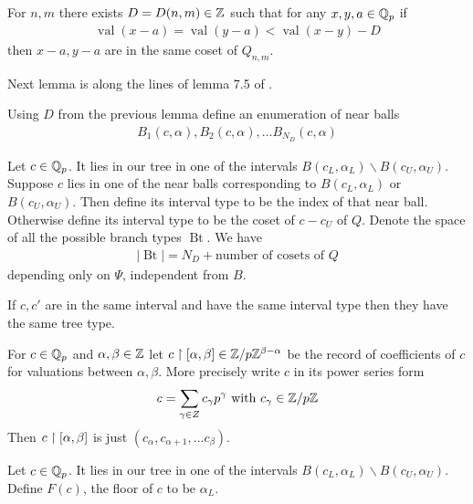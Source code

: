 \documentclass{amsart}
\DeclareMathOperator{\Bt}{Bt}
\DeclareMathOperator{\val}{val}
\begin{document}
\begin{Lemma}
	For $n,m$ there exists $D = D(n,m) \in \mathbb{Z}$ such that for any $x,y,a \in \mathbb{Q}_p$ if
	\begin{align*}
		\val (x - a) = \val (y - a) < \val (x - y) - D
	\end{align*}
	then $x - a, y - a$ are in the same coset of $Q_{n,m}$.
\end{Lemma}

Next lemma is along the lines of lemma 7.5 of \cite{density}.

\begin{Lemma}
	Using $D$ from the previous lemma define an enumeration of near balls
	\begin{align*}
		B_1(c, \alpha), B_2(c, \alpha), \ldots B_{N_D}(c, \alpha)
	\end{align*}
\end{Lemma}

\begin{Definition}
	Let $c \in \mathbb{Q}_p$.
	It lies in our tree in one of the intervals $B(c_L, \alpha_L) \backslash B(c_U, \alpha_U)$.
	Suppose $c$ lies in one of the near balls corresponding to $B(c_L, \alpha_L)$ or $B(c_U, \alpha_U)$.
	Then define its interval type to be the index of that near ball.
	Otherwise define its interval type to be the coset of $c - c_U$ of $Q$.
	Denote the space of all the possible branch types $\Bt$.
	We have
	\begin{align*}
		|\Bt| = N_D + \text {number of cosets of $Q$}
	\end{align*}
	depending only on $\Psi$, independent from $B$.
	
\end{Definition}

\begin{Lemma}
	If $c, c'$ are in the same interval and have the same interval type then they have the same tree type.
\end{Lemma}

\begin{Definition}
	For $c \in \mathbb{Q}_p$ and $\alpha, \beta \in \mathbb{Z}$ let $c \upharpoonright [\alpha, \beta] \in \mathbb{Z}/p\mathbb{Z}^{\beta - \alpha}$ be the record of coefficients of $c$ for valuations between $\alpha, \beta$. More precisely write $c$ in its power series form
	\begin{align*}
		c = \sum_{\gamma \in Z} c_\gamma p^\gamma \text{ with } c_\gamma \in \mathbb{Z}/p\mathbb{Z}
	\end{align*}
	Then $c \upharpoonright [\alpha, \beta]$ is just $(c_\alpha, c_{\alpha+1}, \ldots c_\beta)$.
\end{Definition}
\begin{Definition}
	Let $c \in \mathbb{Q}_p$.
	It lies in our tree in one of the intervals $B(c_L, \alpha_L) \backslash B(c_U, \alpha_U)$.
	Define $F(c)$, the floor of $c$ to be $\alpha_L$.
\end{Definition}
\end{document}

